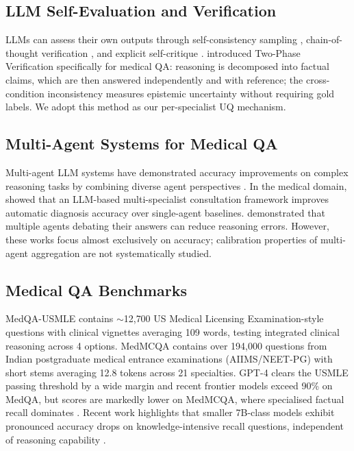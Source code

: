 \documentclass[10pt]{article}
\begin{document}
\subsection{LLM Self-Evaluation and Verification}

LLMs can assess their own outputs through self-consistency sampling
\citep{wang2023selfconsistency}, chain-of-thought verification
\citep{wei2022chain}, and explicit self-critique \citep{madaan2023selfrefine}.
\citet{wu2024uncertainty} introduced Two-Phase Verification specifically for
medical QA: reasoning is decomposed into factual claims, which are then
answered independently and with reference; the cross-condition inconsistency
measures epistemic uncertainty without requiring gold labels.  We adopt this
method as our per-specialist UQ mechanism.

\subsection{Multi-Agent Systems for Medical QA}

Multi-agent LLM systems have demonstrated accuracy improvements on complex
reasoning tasks by combining diverse agent perspectives
\citep{wang2024mixture, li2024camel, liang2023encouraging}.  In the medical
domain, \citet{wang2024multi} showed that an LLM-based multi-specialist
consultation framework improves automatic diagnosis accuracy over
single-agent baselines.  \citet{du2023improving}
demonstrated that multiple agents debating their answers can reduce reasoning
errors.  However, these works focus almost exclusively on accuracy; calibration
properties of multi-agent aggregation are not systematically studied.

\subsection{Medical QA Benchmarks}

MedQA-USMLE \citep{jin2021disease} contains $\sim$12{,}700 US Medical
Licensing Examination-style questions with clinical vignettes averaging 109
words, testing integrated clinical reasoning across 4 options.  MedMCQA
\citep{pal2022medmcqa} contains over 194{,}000 questions from Indian
postgraduate medical entrance examinations (AIIMS/NEET-PG) with short stems
averaging 12.8 tokens across 21 specialties.  GPT-4 clears the USMLE passing threshold by a wide margin
\citep{nori2023capabilities} and recent frontier models exceed 90\% on
MedQA, but scores are markedly lower on MedMCQA, where specialised factual recall dominates
\citep{pal2022medmcqa, singh2025neet}.  Recent work highlights that
smaller 7B-class models exhibit pronounced accuracy drops on knowledge-intensive
recall questions, independent of reasoning capability
\citep{singh2025neet, wei2022emergent}.
\end{document}

